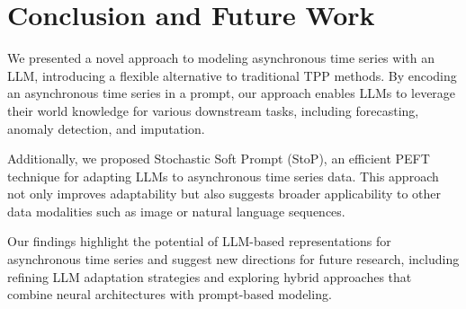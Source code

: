 \section{Conclusion and Future Work}
\label{sec:conclusion}

We presented a novel approach to modeling asynchronous time series with an LLM, introducing a flexible alternative to  traditional TPP methods. By encoding an asynchronous time series in a prompt, our approach enables LLMs to leverage their world knowledge for various downstream tasks, including forecasting, anomaly detection, and imputation.

Additionally, we proposed Stochastic Soft Prompt (StoP), an efficient PEFT technique for adapting LLMs to asynchronous time series data. This approach not only improves adaptability but also suggests broader applicability to other data modalities such as image or natural language sequences.

Our findings highlight the potential of LLM-based representations for asynchronous time series and suggest new directions for future research, including refining LLM adaptation strategies and exploring hybrid approaches that combine neural architectures with prompt-based modeling.
